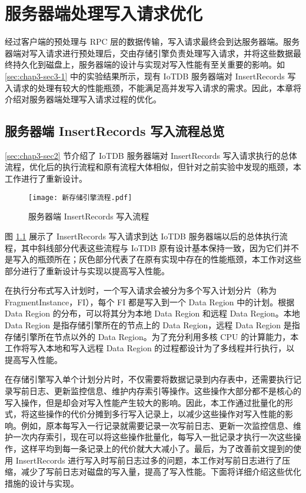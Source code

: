 
\chapter{服务器端处理写入请求优化}
经过客户端的预处理与 RPC 层的数据传输，写入请求最终会到达服务器端。服务器端对写入请求进行预处理后，交由存储引擎负责处理写入请求，并将这些数据最终持久化到磁盘上，服务器端的设计与实现对写入性能有至关重要的影响。如 \ref{sec:chap3-sec3-1} 中的实验结果所示，现有 IoTDB 服务器端对 InsertRecords 写入请求的处理有较大的性能瓶颈，不能满足高并发写入请求的需求。因此，本章将介绍对服务器端处理写入请求过程的优化。


\section{服务器端 InsertRecords 写入流程总览}
\ref{sec:chap3-sec2} 节介绍了 IoTDB 服务器端对 InsertRecords 写入请求执行的总体流程，优化后的执行流程和原有流程大体相似，但针对之前实验中发现的瓶颈，本工作进行了重新设计。

\begin{figure}
  \centering
  \texttt{[image: 新存储引擎流程.pdf]}
  \caption{服务器端 InsertRecords 写入流程}
  \label{fig:iotdb-insertRecords-flow}
\end{figure}

图 \ref{fig:iotdb-insertRecords-flow} 展示了 InsertRecords 写入请求到达 IoTDB 服务器端以后的总体执行流程，其中斜线部分代表这些流程与 IoTDB 原有设计基本保持一致，因为它们并不是写入的瓶颈所在；灰色部分代表了在原有实现中存在的性能瓶颈，本工作对这些部分进行了重新设计与实现以提高写入性能。


在执行分布式写入计划时，一个写入请求会被分为多个写入计划分片（称为 FragmentInstance，FI），每个 FI 都是写入到一个 Data Region 中的计划。根据 Data Region 的分布，可以将其分为本地 Data Region 和远程 Data Region。本地 Data Region 是指存储引擎所在的节点上的 Data Region，远程 Data Region 是指存储引擎所在节点以外的 Data Region。为了充分利用多核 CPU 的计算能力，本工作将写入本地和写入远程 Data Region 的过程都设计为了多线程并行执行，以提高写入性能。

在存储引擎写入单个计划分片时，不仅需要将数据记录到内存表中，还需要执行记录写前日志、更新监控信息、维护内存索引等操作。这些操作大部分都不是核心的写入操作，但是却会对写入性能产生较大的影响。因此，本工作通过批量化的形式，将这些操作的代价分摊到多行写入记录上，以减少这些操作对写入性能的影响。例如，原本每写入一行记录就需要记录一次写前日志、更新一次监控信息、维护一次内存索引，现在可以将这些操作批量化，每写入一批记录才执行一次这些操作，这样平均到每一条记录上的代价就大大减小了。最后，为了改善前文提到的使用 InsertRecords 进行写入时写前日志过多的问题，本工作对写前日志进行了压缩，减少了写前日志对磁盘的写入量，提高了写入性能。下面将详细介绍这些优化措施的设计与实现。

